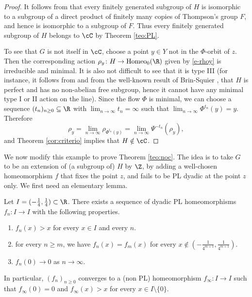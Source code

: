 \documentclass[reqno]{amsart}
\begin{document}
\begin{proof}
It follows from \cite[Lemma 7.2]{MatteBonTriestino2020} that every finitely generated subgroup of $H$ is isomorphic to a subgroup of a direct product of finitely many copies of Thompson's group $F$, and hence is isomorphic to a subgroup of $F$. Thus every finitely generated subgroup of $H$ belongs to $\cC$ by Theorem \ref{teo:PL}.

To see that $G$ is not itself in $\cC$, choose a point $y\in Y$ not in the $\Phi$-orbit of $z$. Then the corresponding action $\rho_y\colon H\to \mathrm{Homeo}_0(\R)$ given by \eqref{e-rhoy} is irreducible and minimal.  It is also not difficult to see that it is type III (for instance, it follows from \cite[Lemma 7.2]{MatteBonTriestino2020} and from the well-known result of Brin-Squier \cite{BrinSquier1985}, that $H$ is perfect and has no non-abelian free subgroup, hence it cannot have any minimal type I or II action on the line). Since the flow $\Phi$ is minimal, we can choose a sequence $(t_n)_{n \geq 0} \subseteq \R$ with $\lim_{n \to \infty} t_n = \infty$ such that $\lim_{n\to \infty} \Phi^{t_n}(y)=y$. Therefore
\[\rho_y=\lim_{n\to \infty} \rho_{\Phi^{t_n}(y)}=\lim_{n\to \infty} \Psi^{-t_n}(\rho_y),\]
and Theorem \ref{cor:criterio} implies that $H\notin \cC$.
\end{proof}

We now modify this example to prove Theorem \ref{teo:noc}. The idea is to take $G$ to be an extension of (a subgroup of) $H$ by $\Z$, by adding a well-chosen homeomorphism $f$ that fixes the point $z$, and fails to be PL dyadic at the point $z$ only. We first need an elementary lemma.

\begin{lema}\label{lema:sequencePL}
    Let $I=(-\frac{1}{4}, \frac{1}{4})\subset \R$. There exists a sequence of dyadic PL homeomorphisms $f_n\colon I\to I$ with the following properties. 
    \begin{enumerate}
        \item $f_n(x)>x$ for every $x\in I$ and every $n$.
        \item for every $n\ge m$, we have $f_n(x)=f_m(x)$ for every $x\notin (-\frac{1}{4^{m+1}}, \frac{1}{4^{m+1}})$.
        \item $f_n(0)\to 0$ as $n\to \infty$.
    \end{enumerate}
    In particular, $(f_n)_{n \geq 0}$ converges to a (non PL) homeomorphism $f_\infty \colon I \to I$ such that $f_\infty(0)=0$ and  $f_\infty(x)>x$ for every $x\in I\setminus\{0\}$. 
\end{lema}
\end{document}
